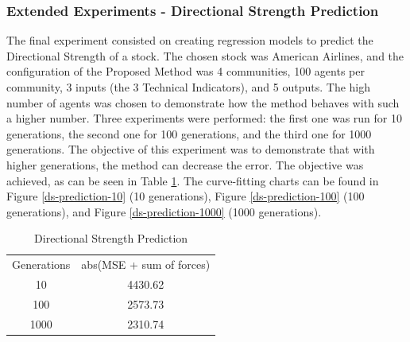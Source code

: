 \documentclass[a4paper,twoside]{article}
\begin{document}
\subsubsection{Extended Experiments - Directional Strength Prediction}
  
The final experiment consisted on creating regression models to predict the Directional Strength of a stock. The chosen stock was American Airlines, and the configuration of the Proposed Method was 4 communities, 100 agents per community, 3 inputs (the 3 Technical Indicators), and 5 outputs. The high number of agents was chosen to demonstrate how the method behaves with such a higher number. Three experiments were performed: the first one was run for 10 generations, the second one for 100 generations, and the third one for 1000 generations. The objective of this experiment was to demonstrate that with higher generations, the method can decrease the error. The objective was achieved, as can be seen in Table \ref{ds-mse-table}. The curve-fitting charts can be found in Figure \ref{ds-prediction-10} (10 generations), Figure \ref{ds-prediction-100} (100 generations), and Figure \ref{ds-prediction-1000} (1000 generations).

\begin{table}
    \caption{{Directional Strength Prediction}}
    \label{ds-mse-table}
    \begin{tabular}{ c c }
        Generations & abs(MSE + sum of forces) \\ 
        10 & 4430.62 \\ 
        100 & 2573.73 \\ 
        1000 & 2310.74 \\ 
    \end{tabular} 
\end{table}
  
  
  
  
  
  
  
  
  
  
  
  
  
  
  
  
  
  
  
  
  
  
  
  
  
  
  
  
  
  
  
  
  
\end{document}
